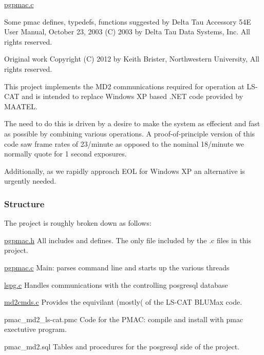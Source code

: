 \hyperlink{pgpmac_8c}{pgpmac.c}

Some pmac defines, typedefs, functions suggested by Delta Tau Accessory 54E User Manual, October 23, 2003 (C) 2003 by Delta Tau Data Systems, Inc. All rights reserved.

Original work Copyright (C) 2012 by Keith Brister, Northwestern University, All rights reserved.

This project implements the MD2 communications required for operation at LS-\/CAT and is intended to replace Windows XP based .NET code provided by MAATEL.

The need to do this is driven by a desire to make the system as effecient and fast as possible by combining various operations. A proof-\/of-\/principle version of this code saw frame rates of 23/minute as opposed to the nominal 18/minute we normally quote for 1 second exposures.

Additionally, as we rapidly approach EOL for Windows XP an alternative is urgently needed.

\subsubsection*{Structure}

The project is roughly broken down as follows:

\hyperlink{pgpmac_8h}{pgpmac.h} All includes and defines. The only file included by the .c files in this project.

\hyperlink{pgpmac_8c}{pgpmac.c} Main: parses command line and starts up the various threads

\hyperlink{lspg_8c}{lspg.c} Handles communications with the controlling posgresql database

\hyperlink{md2cmds_8c}{md2cmds.c} Provides the equivilant (mostly( of the LS-\/CAT BLUMax code.

pmac\_\-md2\_\-ls-\/cat.pmc Code for the PMAC: compile and install with pmac exectutive program.

pmac\_\-md2.sql Tables and procedures for the posgresql side of the project.

